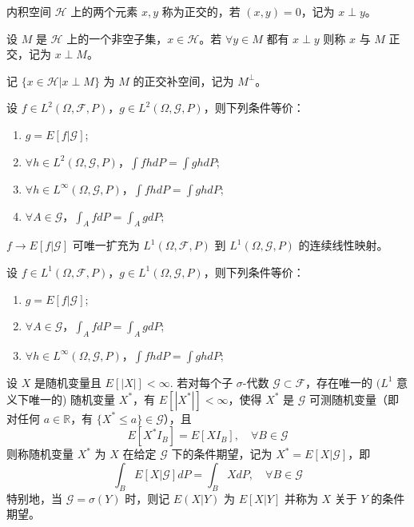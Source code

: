 \documentclass[lang=cn,10pt,thmcnt=section]{elegantbook}
\begin{document}
\begin{definition}
	内积空间 $\mathcal{H}$ 上的两个元素 $x, y$ 称为正交的，若 $(x, y) = 0$，记为 $x \perp y$。

设 $M$ 是 $\mathcal{H}$ 上的一个非空子集，$x \in \mathcal{H}$。若 $\forall y \in M$ 都有 $x \perp y$ 则称 $x$ 与 $M$ 正交，记为 $x \perp M$。

记 $\{x \in \mathcal{H} | x \perp M\}$ 为 $M$ 的正交补空间，记为 $M^\perp$。
\end{definition}
\begin{theorem}
	设 $f \in L^2(\Omega, \mathcal{F}, P)$，$g \in L^2(\Omega, \mathcal{G}, P)$，则下列条件等价：
\begin{enumerate}
    \item $g = E[f|\mathcal{G}]$;
    \item $\forall h \in L^2(\Omega, \mathcal{G}, P)$，$\int f h dP = \int g h dP$;
    \item $\forall h \in L^\infty(\Omega, \mathcal{G}, P)$，$\int f h dP = \int g h dP$;
    \item $\forall A \in \mathcal{G}$，$\int_A f dP = \int_A g dP$;
\end{enumerate}
\end{theorem}
\begin{theorem}
	$f \rightarrow E[f|\mathcal{G}]$ 可唯一扩充为 $L^1(\Omega, \mathcal{F}, P)$ 到 $L^1(\Omega, \mathcal{G}, P)$ 的连续线性映射。

\end{theorem}
\begin{theorem}
	设 $f \in L^1(\Omega, \mathcal{F}, P)$，$g \in L^1(\Omega, \mathcal{G}, P)$，则下列条件等价：
\begin{enumerate}
    \item $g = E[f|\mathcal{G}]$;
    \item $\forall A \in \mathcal{G}$，$\int_A f dP = \int_A g dP$;
    \item $\forall h \in L^\infty(\Omega, \mathcal{G}, P)$，$\int f h dP = \int g h dP$;
\end{enumerate}
\end{theorem}
\begin{definition}
	设 $X$ 是随机变量且 $E[|X|] < \infty$. 若对每个子 $\sigma$-代数 $\mathcal{G} \subset \mathcal{F}$，存在唯一的 $(L^1$ 意义下唯一的) 随机变量 $X^*$，有 $E[|X^*|] < \infty$，使得 $X^*$ 是 $\mathcal{G}$ 可测随机变量（即对任何 $a \in \mathbb{R}$，有 $\{X^* \leq a\} \in \mathcal{G}$），且
\[
E[X^* I_B] = E[X I_B], \quad \forall B \in \mathcal{G}
\]
则称随机变量 $X^*$ 为 $X$ 在给定 $\mathcal{G}$ 下的条件期望，记为 $X^* = E[X|\mathcal{G}]$，即
\[
\int_B E[X|\mathcal{G}] dP = \int_B X dP, \quad \forall B \in \mathcal{G}
\]
特别地，当 $\mathcal{G} = \sigma(Y)$ 时，则记 $E(X|Y)$ 为 $E[X|Y]$ 并称为 $X$ 关于 $Y$ 的条件期望。
\end{definition}
\end{document}
